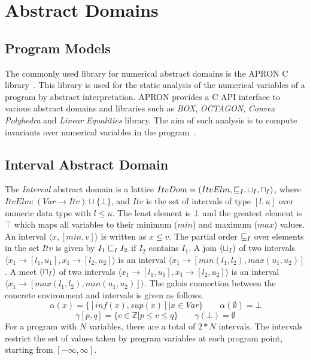 \section{Abstract Domains}
\subsection{Program Models}

The commonly used library for numerical abstract domains  
is the APRON C library~\cite{apron}.  This library is 
used for the static analysis of the numerical variables 
of a program by abstract interpretation. APRON provides a 
C API interface to various abstract domains and libraries 
such as {\em BOX}, {\em OCTAGON}, {\em Convex Polyhedra} and
{\em Linear Equalities} library.  The aim of such analysis is 
to compute invariants over numerical variables in the 
program~\cite{se2011}. 

\subsection{Interval Abstract Domain}
The {\em Interval} abstract domain is a lattice 
$ItvDom = (ItvElm, \sqsubseteq_{I}, \sqcup_{I}, \sqcap_{I})$, where
$ItvElm: (Var \rightarrow Itv) \cup \{\bot\}$, and $Itv$ is 
the set of intervals of type $[l,u]$ over numeric data 
type with $l \leq u$. The least element is $\bot$ and the 
greatest element is $\top$ which maps all variables to their
minimum ($min$) and maximum ($max$) values.  An interval 
$\langle x, [min, v] \rangle$ is written as $x \leq v$.  The 
partial order $\sqsubseteq_{I}$ over elements in the set $Itv$ is 
given by $I_1 \sqsubseteq_{I} I_2$ if $I_2$ contains $I_1$.
A join $(\sqcup_{I})$ of two intervals $\langle x_1 \rightarrow [l_1, u_1], 
x_1 \rightarrow [l_2, u_2] \rangle$ is an interval 
$\langle x_1 \rightarrow [min(l_1, l_2), max(u_1, u_2)]$.
A meet $(\sqcap_{I})$ of two intervals $\langle x_1 \rightarrow [l_1, u_1], 
x_1 \rightarrow [l_2, u_2] \rangle$ is an interval 
$\langle x_1 \rightarrow [max(l_1, l_2), min(u_1, u_2)] \rangle$.
The galois connection between the concrete environment and intervals is 
given as follows.
\[\alpha(x) = \{[inf(x), sup(x)] | x \in Var\} \qquad   \alpha(\emptyset) = \bot \]
\[\gamma[p,q] = \{c \in \mathbb{Z} | p \leq c \leq q\} \qquad \gamma(\bot) = \emptyset \]
For a program with $N$ variables, there are a total of 
$2*N$ intervals. The intervals restrict the set of values 
taken by program variables at each program point, starting 
from $[-\infty, \infty]$.   

